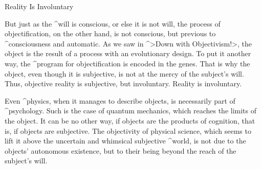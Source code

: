 \Section Reality Is Involuntary

But just as the ^{will} is conscious, or else it is not will, the
process of objectification, on the other hand, is not conscious, but
previous to ^{consciousness} and automatic. As we saw in ^>Down with
Objectivism!>,  the object is the result of a process with an
evolutionary design. To put it another way, the ^{program} for
objectification is encoded in the genes. That is why the object, even
though it is subjective, is not at the mercy of the subject's will.
Thus, objective reality is subjective, but involuntary. Reality is
involuntary.

Even ^{physics}, when it manages to describe objects, is necessarily
part of ^{psychology}. Such is the case of quantum mechanics, which
reaches the limits of the object. It can be no other way, if objects are
the products of cognition, that is, if objects are subjective. The
objectivity of physical science, which seems to lift it above the
uncertain and whimsical subjective ^{world}, is not due to the objects'
autonomous existence, but to their being beyond the reach of the
subject's will.

\endinput
